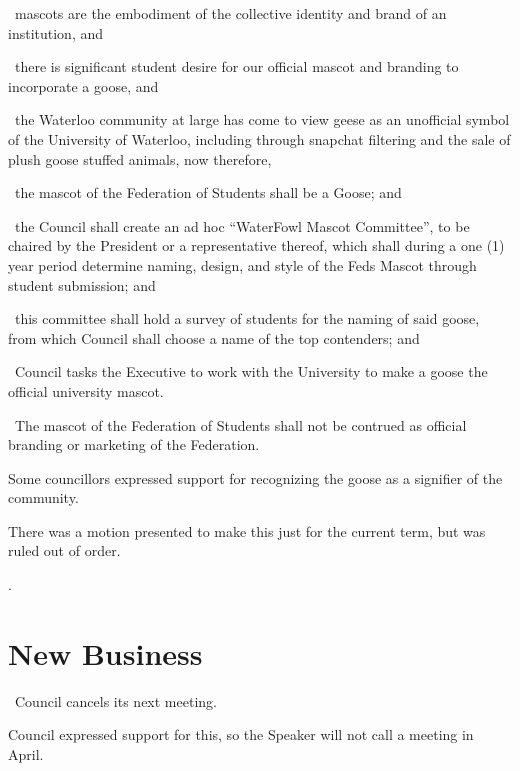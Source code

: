 \begin{motion}
    \whereas\ mascots are the embodiment of the collective identity and
    brand of an institution, and

    \whereas\ there is significant student desire for our official mascot
    and branding to incorporate a goose, and

    \whereas\ the Waterloo community at large has come to view geese as an
    unofficial symbol of the University of Waterloo, including through
    snapchat filtering and the sale of plush goose stuffed animals, now
    therefore,

    \birt\ the mascot of the Federation of Students shall be a Goose; and

    \bifrt\ the Council shall create an ad hoc “WaterFowl Mascot
    Committee”, to be chaired by the President or a representative
    thereof, which shall during a one (1) year period determine naming,
    design, and style of the Feds Mascot through student submission; and

    \bifrt\ this committee shall hold a survey of students for the naming
    of said goose, from which Council shall choose a name of the top
    contenders; and

    \bifrt\ Council tasks the Executive to work with the University to make
    a goose the official university mascot. 

    \bifrt\ The mascot of the Federation of Students shall not be contrued as
    official branding or marketing of the Federation.

    \movers{\seneca}{\jennifer}

    Some councillors expressed support for recognizing the goose as a signifier
    of the community.

    There was a motion presented to make this just for the current term, but
    was ruled out of order. 
    
    \carries. 
\end{motion}

\section*{New Business}

\begin{motion}
    \birt\ Council cancels its next meeting.

    Council expressed support for this, so the Speaker will not call a meeting
    in April.
\end{motion}

